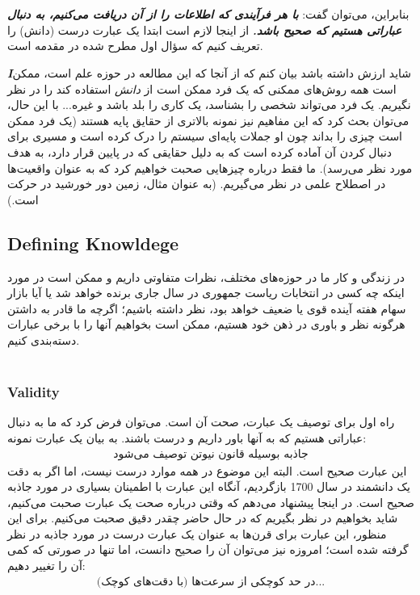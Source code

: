 \documentclass[10pt,a4paper]{article}
\newenvironment{callout}
	{\begin{calloutbox}\color{charcoal}\textbf\textit}
	{\end{calloutbox}}
\begin{document}
            \\
            \\
            بنابراین، می‌توان گفت: \textbf{\textit{با هر فرآیندی که اطلاعات را از آن دریافت می‌کنیم، به دنبال عباراتی هستیم که صحیح باشد.}} از اینجا لازم است ابتدا یک عبارت درست (دانش) را تعریف کنیم که سؤال اول مطرح شده در مقدمه است.
            \begin{callout}
                Iشاید ارزش داشته باشد بیان کنم که از آنجا که این مطالعه در حوزه علم است، ممکن است همه روش‌های ممکنی که یک فرد ممکن است از \textit{دانش} استفاده کند را در نظر نگیریم. یک فرد می‌تواند شخصی را بشناسد، یک کاری را بلد باشد و غیره... با این حال، می‌توان بحث کرد که این مفاهیم نیز نمونه بالاتری از حقایق پایه هستند (یک فرد ممکن است چیزی را بداند چون او جملات پایه‌ای سیستم را درک کرده است و مسیری برای دنبال کردن آن آماده کرده است که به دلیل حقایقی که در پایین قرار دارد، به هدف مورد نظر می‌رسد). ما فقط درباره چیزهایی صحبت خواهیم کرد که به عنوان واقعیت‌ها در اصطلاح علمی در نظر می‌گیریم. (به عنوان مثال، زمین دور خورشید در حرکت است.)
            \end{callout}
                \subsection{Defining Knowldege} در زندگی و کار ما در حوزه‌های مختلف، نظرات متفاوتی داریم و ممکن است در مورد اینکه چه کسی در انتخابات ریاست جمهوری در سال جاری برنده خواهد شد یا آیا بازار سهام هفته آینده قوی یا ضعیف خواهد بود، نظر داشته باشیم؛ اگرچه ما قادر به داشتن هرگونه نظر و باوری در ذهن خود هستیم، ممکن است بخواهیم آنها را با برخی عبارات دسته‌بندی کنیم.\cite{CW/E}\cite{sep-epistemology}
                \\
                \\
                \subsubsection{Validity}راه اول برای توصیف یک عبارت، صحت آن است. می‌توان فرض کرد که ما به دنبال عباراتی هستیم که به آنها باور داریم و درست باشند. به بیان یک عبارت نمونه:
                \begin{align*}
                    \text{جاذبه بوسیله قانون نیوتن توصیف می‌شود}
                \end{align*}
                این عبارت صحیح است. البته این موضوع در همه موارد درست نیست، اما اگر به دقت یک دانشمند در سال 1700 بازگردیم، آنگاه این عبارت با اطمینان بسیاری در مورد جاذبه صحیح است. در اینجا پیشنهاد می‌دهم که وقتی درباره صحت یک عبارت صحبت می‌کنیم، شاید بخواهیم در نظر بگیریم که در حال حاضر چقدر دقیق صحبت می‌کنیم. برای این منظور، این عبارت برای قرن‌ها به عنوان یک عبارت درست در مورد جاذبه در نظر گرفته شده است؛ امروزه نیز می‌توان آن را صحیح دانست، اما تنها در صورتی که کمی آن را تغییر دهیم:
                \begin{align*}
                    \text{در حد کوچکی از سرعت‌ها (با دقت‌های کوچک)...}
                \end{align*}   
\end{document}
